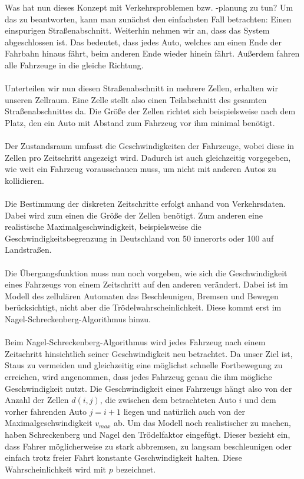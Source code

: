 \hspace{-0.6cm} Was hat nun dieses Konzept mit Verkehrsproblemen bzw. -planung zu tun? Um das zu beantworten, kann man zunächst den einfachsten Fall betrachten: Einen einspurigen Straßenabschnitt. Weiterhin nehmen wir an, dass das System abgeschlossen ist. Das bedeutet, dass jedes Auto, welches am einen Ende der Fahrbahn hinaus fährt, beim anderen Ende wieder hinein fährt. Außerdem fahren alle Fahrzeuge in die gleiche Richtung. 
\\ \\
Unterteilen wir nun diesen Straßenabschnitt in mehrere Zellen, erhalten wir unseren Zellraum. Eine Zelle stellt also einen Teilabschnitt des gesamten Straßenabschnittes da. Die Größe der Zellen richtet sich beispielsweise nach dem Platz, den ein Auto mit Abstand zum Fahrzeug vor ihm minimal benötigt. 
\\ \\
Der Zustandsraum umfasst die Geschwindigkeiten der Fahrzeuge, wobei diese in Zellen pro Zeitschritt angezeigt wird. Dadurch ist auch gleichzeitig vorgegeben, wie weit ein Fahrzeug vorausschauen muss, um nicht mit anderen Autos zu kollidieren. 
\\ \\
Die Bestimmung der diskreten Zeitschritte erfolgt anhand von Verkehrsdaten. Dabei wird zum einen die Größe der Zellen benötigt. Zum anderen eine realistische Maximalgeschwindigkeit, beispielsweise die Geschwindigkeitsbegrenzung in Deutschland von 50 innerorts oder 100 auf Landstraßen. 
\\ \\
Die Übergangsfunktion muss nun noch vorgeben, wie sich die Geschwindigkeit eines Fahrzeugs von einem Zeitschritt auf den anderen verändert. Dabei ist im Modell des zellulären Automaten das Beschleunigen, Bremsen und Bewegen berücksichtigt, nicht aber die Trödelwahrscheinlichkeit. Diese kommt erst im Nagel-Schreckenberg-Algorithmus hinzu. 
\\ \\
Beim Nagel-Schreckenberg-Algorithmus wird jedes Fahrzeug nach einem Zeitschritt hinsichtlich seiner Geschwindigkeit neu betrachtet. Da unser Ziel ist, Staus zu vermeiden und gleichzeitig eine möglichst schnelle Fortbewegung zu erreichen, wird angenommen, dass jedes Fahrzeug genau die ihm mögliche Geschwindigkeit nutzt. Die Geschwindigkeit eines Fahrzeugs hängt also von der Anzahl der Zellen $d(i,j)$, die zwischen dem betrachteten Auto $i$ und dem vorher fahrenden Auto $j=i+1$ liegen und natürlich auch von der Maximalgeschwindigkeit \( v_{max} \) ab. Um das Modell noch realistischer zu machen, haben Schreckenberg und Nagel den Trödelfaktor eingefügt. Dieser bezieht ein, dass Fahrer möglicherweise zu stark abbremsen, zu langsam beschleunigen oder einfach trotz freier Fahrt konstante Geschwindigkeit halten. Diese Wahrscheinlichkeit wird mit $p$ bezeichnet.\\ 


